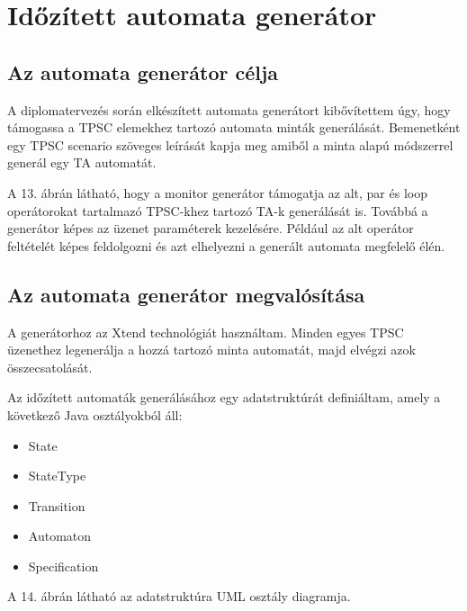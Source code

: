\chapter{Időzített automata generátor}

\section{Az automata generátor célja}

A diplomatervezés során elkészített automata generátort kibővítettem úgy, hogy támogassa a TPSC elemekhez tartozó automata minták generálását. Bemenetként egy TPSC scenario szöveges leírását kapja meg amiből a minta alapú módszerrel generál egy TA automatát.

A 13. ábrán látható, hogy a monitor generátor támogatja az alt, par és loop operátorokat tartalmazó TPSC-khez tartozó TA-k generálását is. Továbbá a generátor képes az üzenet paraméterek kezelésére. Például az alt operátor feltételét képes feldolgozni és azt elhelyezni a generált automata megfelelő élén.

\section{Az automata generátor megvalósítása}
A generátorhoz az Xtend technológiát használtam. Minden egyes TPSC üzenethez legenerálja a hozzá tartozó minta automatát, majd elvégzi azok összecsatolását.

Az időzített automaták generálásához egy adatstruktúrát definiáltam, amely a következő Java osztályokból áll:
\begin{itemize}
    \item State
    \item StateType
    \item Transition
    \item Automaton
    \item Specification
\end{itemize}

A 14. ábrán látható az adatstruktúra UML osztály diagramja.

